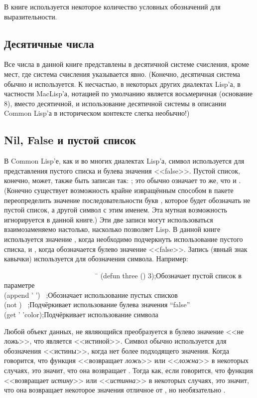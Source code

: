 В книге используется некоторое количество условных обозначений для выразительности. 

\subsection{Десятичные числа}

Все числа в данной книге представлены в десятичной системе счисления, кроме мест,
где система счисления указывается явно. 
(Конечно, десятичная система обычно и используется.
К несчастью, в некоторых других диалектах Lisp'а, в частности MacLisp'а,
нотацией по умолчанию является восьмеричная (основание 8), вместо десятичной, и
использование десятичной системы в описании Common Lisp'а в историческом
контексте слегка необычно!) 

\subsection{Nil, False и пустой список}

В Common Lisp'е, как и во многих диалектах Lisp'а, символ  используется
для представления пустого списка и булева значения <<false>>. Пустой список,
конечно, может, также быть записан так: \cd{()}; это обычно означает то же, что
и .
(Конечно существует возможность крайне извращённым способом в пакете
переопределить значение последовательности букв , которое будет 
обозначать не пустой список, а другой символ с этим именем. Эта мутная
возможность игнорируется в данной книге.)
Эти две записи могут использоваться взаимозаменяемо настолько, насколько
позволяет Lisp. В данной книге используется значение {\emptylist}, когда необходимо
подчеркнуть использование пустого списка, и {\false}, когда обозначается булево
значение <<false>>. Запись  (явный знак кавычки) используется для
обозначения символа.
Например:
\begin{lisp}
~~~~~~~~~~~~~~~~~~~~~~~~~~~\=\kill
(defun three () 3)\>;\textrm{Обозначает пустой список в параметре} \\
(append '{\emptylist} '{\emptylist}) \EV\ {\emptylist}\>;\textrm{Обозначает использование
пустых списков} \\
(not {\false}) \EV\ {\true}\>;\textrm{Подчёркивает использование булева значения ``false''} \\
(get '{\nil} 'color)\>;\textrm{Подчёркивает использование символа}
\end{lisp}

Любой объект данных, не являющийся {\false} преобразуется в булево значение
<<не ложь>>, что является <<истиной>>. Символ {\true} обычно используется для
обозначения <<истины>>, когда нет более подходящего значения.
Когда говорится, что функция <<возвращает \emph{ложь}>> или <<\emph{ложна}>>
в некоторых случаях, это значит, что она возвращает {\false}.
Тогда как, если говорится, что функция <<возвращает \emph{истину}>> или
<<\emph{истинна}>> в некоторых случаях, это значит, что она возвращает некоторое
значения отличное от {\false}, но необязательно {\true}.

